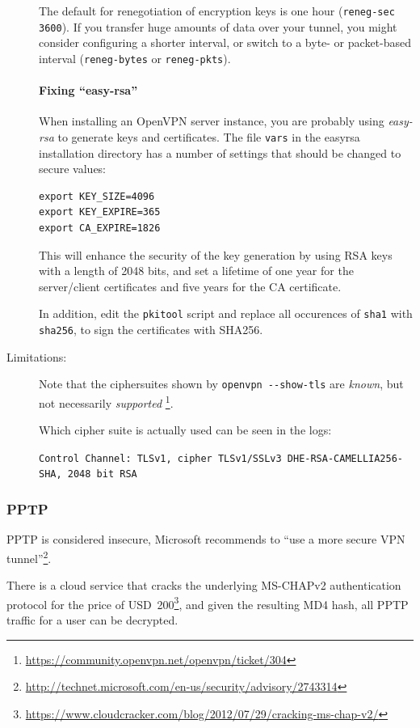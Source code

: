 \begin{description}
The default for renegotiation of encryption keys is one hour
(\verb|reneg-sec 3600|). If you
transfer huge amounts of data over your tunnel, you might consider
configuring a shorter interval, or switch to a byte- or packet-based
interval (\verb|reneg-bytes| or \verb|reneg-pkts|).

\paragraph{Fixing ``easy-rsa''}\mbox{}

When installing an OpenVPN server instance, you are probably using
{\it easy-rsa} to generate keys and certificates.
The file \verb|vars| in the easyrsa installation directory has a
number of settings that should be changed to secure values:

\begin{lstlisting}[breaklines]
export KEY_SIZE=4096
export KEY_EXPIRE=365
export CA_EXPIRE=1826
\end{lstlisting}

This will enhance the security of the key generation by using RSA keys
with a length of 2048 bits, and set a lifetime of one year for the
server/client certificates and five years for the CA certificate.

In addition, edit the \verb|pkitool| script and replace all occurences
of \verb|sha1| with \verb|sha256|, to sign the certificates with
SHA256.

\item[Limitations:] \mbox{}

Note that the ciphersuites shown by \verb|openvpn --show-tls| are {\it
known}, but not necessarily {\it
supported} \footnote{\url{https://community.openvpn.net/openvpn/ticket/304}}.

Which cipher suite is actually used can be seen in the logs:

\verb|Control Channel: TLSv1, cipher TLSv1/SSLv3 DHE-RSA-CAMELLIA256-SHA, 2048 bit RSA|

\end{description}


\subsubsection{PPTP}

PPTP is considered insecure, Microsoft recommends to ``use a more secure VPN
tunnel''\footnote{\url{http://technet.microsoft.com/en-us/security/advisory/2743314}}.

There is a cloud service that cracks the underlying MS-CHAPv2
authentication protocol for the price of USD~200\footnote{\url{https://www.cloudcracker.com/blog/2012/07/29/cracking-ms-chap-v2/}},
and given the resulting MD4 hash, all PPTP traffic for a user can
be decrypted.

